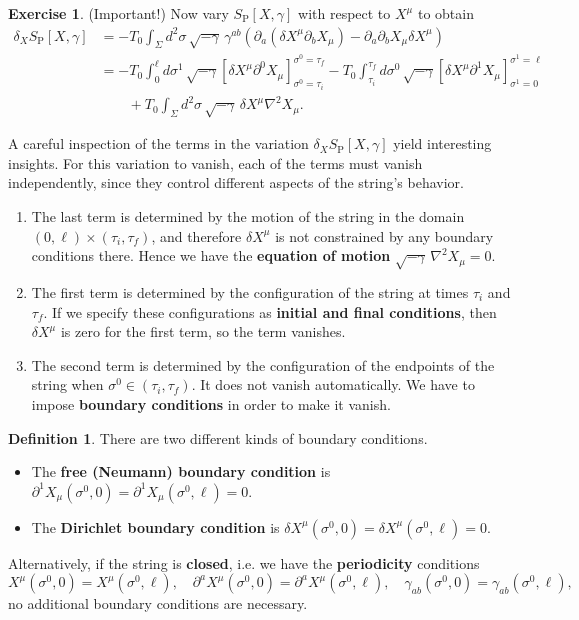 \documentclass{report}
\theoremstyle{plain}
\theoremstyle{definition}
\newtheorem{definition}[theorem]{Definition}
\newtheorem{exercise}{Exercise}[section]
\theoremstyle{remark}
\newcommand{\di}{\partial}
\begin{document}
\begin{exercise} (Important!)
  Now vary $S_{\text{P}}[X, \gamma]$ with respect to $X^\mu$ to obtain
  \begin{align*}
    \delta_X S_{\text{P}}[X, \gamma]
    &= -T_0 \int_\Sigma d^2\sigma \, \sqrt{-\gamma} \, \gamma^{ab} \left(\di_a(\delta X^\mu \di_b X_\mu) - \di_a \di_b X_\mu \delta X^\mu\right) \\
    &= -T_0 \int_0^{\ell} d\sigma^1 \, \sqrt{-\gamma} \left[\delta X^\mu \di^0 X_\mu\right]_{\sigma^0=\tau_i}^{\sigma^0=\tau_f} - T_0 \int_{\tau_i}^{\tau_f} d\sigma^0 \, \sqrt{-\gamma} \left[\delta X^\mu \di^1 X_\mu\right]_{\sigma^1=0}^{\sigma^1=\ell} \\
    &\qquad + T_0 \int_\Sigma d^2\sigma \, \sqrt{-\gamma} \, \delta X^\mu \nabla^2 X_\mu.
  \end{align*}
\end{exercise}

A careful inspection of the terms in the variation $\delta_X
S_{\text{P}}[X, \gamma]$ yield interesting insights. For this
variation to vanish, each of the terms must vanish independently,
since they control different aspects of the string's behavior.
\begin{enumerate}
\item The last term is determined by the motion of the string in the
  domain $(0, \ell) \times (\tau_i, \tau_f)$, and therefore $\delta
  X^\mu$ is not constrained by any boundary conditions there. Hence we
  have the {\bf equation of motion} $\sqrt{-\gamma} \, \nabla^2 X_\mu
  = 0$.
\item The first term is determined by the configuration of the string
  at times $\tau_i$ and $\tau_f$. If we specify these configurations
  as {\bf initial and final conditions}, then $\delta X^\mu$ is zero
  for the first term, so the term vanishes.
\item The second term is determined by the configuration of the
  endpoints of the string when $\sigma^0 \in (\tau_i, \tau_f)$. It
  does not vanish automatically. We have to impose {\bf boundary
    conditions} in order to make it vanish.
\end{enumerate}

\begin{definition}
  There are two different kinds of boundary conditions.
  \begin{itemize}
  \item The {\bf free (Neumann) boundary condition} is $\di^1
    X_\mu(\sigma^0, 0) = \di^1 X_\mu(\sigma^0, \ell) = 0$.
  \item The {\bf Dirichlet boundary condition} is $\delta
    X^\mu(\sigma^0, 0) = \delta X^\mu(\sigma^0, \ell) = 0$.
  \end{itemize}
  Alternatively, if the string is {\bf closed}, i.e. we have the {\bf
    periodicity} conditions
  \[ X^\mu(\sigma^0, 0) = X^\mu(\sigma^0, \ell), \quad \di^a X^\mu(\sigma^0, 0) = \di^a X^\mu(\sigma^0, \ell), \quad \gamma_{ab}(\sigma^0, 0) = \gamma_{ab}(\sigma^0, \ell), \]
  no additional boundary conditions are necessary.
\end{definition}
\end{document}
